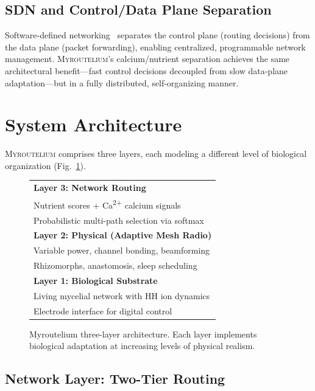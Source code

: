 \documentclass[conference,10pt]{IEEEtran}
\newcommand{\myc}{\textsc{Myroutelium}}
\newcommand{\calcium}{Ca\textsuperscript{2+}}
\begin{document}
\subsection{SDN and Control/Data Plane Separation}

Software-defined networking~\cite{mckeown2008} separates the control plane (routing decisions) from the data plane (packet forwarding), enabling centralized, programmable network management. \myc{}'s calcium/nutrient separation achieves the same architectural benefit---fast control decisions decoupled from slow data-plane adaptation---but in a fully distributed, self-organizing manner.

\section{System Architecture}
\label{sec:architecture}

\myc{} comprises three layers, each modeling a different level of biological organization (Fig.~\ref{fig:architecture}).

\begin{figure}[t]
    \centering
    \small
    \begin{tabular}{|p{}|}
    \hline
    \textbf{Layer 3: Network Routing} \\
    Nutrient scores + \calcium{} calcium signals \\
    Probabilistic multi-path selection via softmax \\
    \hline
    \textbf{Layer 2: Physical (Adaptive Mesh Radio)} \\
    Variable power, channel bonding, beamforming \\
    Rhizomorphs, anastomosis, sleep scheduling \\
    \hline
    \textbf{Layer 1: Biological Substrate} \\
    Living mycelial network with HH ion dynamics \\
    Electrode interface for digital control \\
    \hline
    \end{tabular}
    \caption{Myroutelium three-layer architecture. Each layer implements biological adaptation at increasing levels of physical realism.}
    \label{fig:architecture}
\end{figure}

\subsection{Network Layer: Two-Tier Routing}
\end{document}

